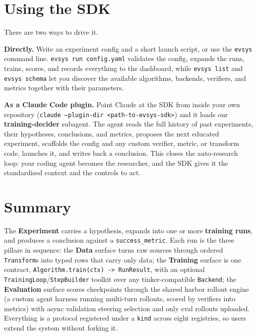 \documentclass[11pt]{article}
\newcommand{\code}[1]{\texttt{\small #1}}
\begin{document}
\section{Using the SDK}

There are two ways to drive it.

\textbf{Directly.} Write an experiment config and a short launch script, or use
the \code{evsys} command line. \code{evsys run config.yaml} validates the config,
expands the runs, trains, scores, and records everything to the dashboard, while
\code{evsys list} and \code{evsys schema} let you discover the available
algorithms, backends, verifiers, and metrics together with their parameters.

\textbf{As a Claude Code plugin.} Point Claude at the SDK from inside your own
repository (\code{claude --plugin-dir <path-to-evsys-sdk>}) and it loads our
\textbf{training-decider} subagent. The agent reads the full history of past
experiments, their hypotheses, conclusions, and metrics, proposes the next
educated experiment, scaffolds the config and any custom verifier, metric, or
transform code, launches it, and writes back a conclusion. This closes the
auto-research loop: your coding agent becomes the researcher, and the SDK gives
it the standardised context and the controls to act.

\section*{Summary}

The \textbf{Experiment} carries a hypothesis, expands into one or more
\textbf{training runs}, and produces a conclusion against a
\code{success\_metric}. Each run is the three pillars in sequence: the
\textbf{Data} surface turns raw sources through ordered \code{Transform}s into
typed rows that carry only data; the \textbf{Training} surface is one contract,
\code{Algorithm.train(ctx) -> RunResult}, with an optional
\code{TrainingLoop}/\code{StepBuilder} toolkit over any tinker-compatible
\code{Backend}; the \textbf{Evaluation} surface scores checkpoints through the
shared harbor rollout engine (a custom agent harness running multi-turn
rollouts, scored by verifiers into metrics) with async validation steering
selection and only eval rollouts uploaded. Everything is a protocol registered
under a \code{kind} across eight registries, so users extend the system without
forking it.
\end{document}
